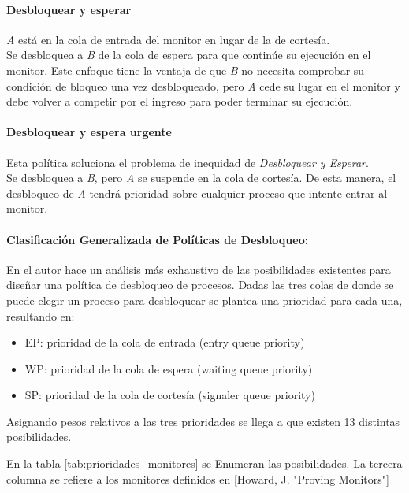 \paragraph{Desbloquear y esperar}
\textit{A} está en la cola de entrada del monitor en lugar de la de cortesía.\\
Se desbloquea a \textit{B} de la cola de espera para que continúe su ejecución
en el monitor. Este enfoque tiene la ventaja de que \textit{B} no necesita
comprobar su condición de bloqueo una vez desbloqueado, pero \textit{A} cede su
lugar en el monitor y debe volver a competir por el ingreso para poder terminar
su ejecución.


\paragraph{Desbloquear y espera urgente}
Esta política soluciona el problema de inequidad de \textit{Desbloquear y
Esperar}.\\
Se desbloquea a \textit{B}, pero \textit{A} se suspende en la cola de cortesía.
De esta manera, el desbloqueo de \textit{A} tendrá prioridad sobre cualquier
proceso que intente entrar al monitor.

\paragraph{Clasificación Generalizada de Políticas de Desbloqueo:}
En \cite{MonitorClassification} el autor hace un análisis más exhaustivo de las
posibilidades existentes para diseñar una política de desbloqueo de procesos.
Dadas las tres colas de donde se puede elegir un proceso para desbloquear se
plantea una prioridad para cada una, resultando en:
\begin{itemize}
    \item EP: prioridad de la cola de entrada (entry queue priority)
    \item WP: prioridad de la cola de espera (waiting queue priority)
    \item SP: prioridad de la cola de cortesía (signaler queue priority)
\end{itemize}
Asignando pesos relativos a las tres prioridades se llega a que existen 13
distintas posibilidades.

En la tabla \ref{tab:prioridades_monitores} se Enumeran las posibilidades. La
tercera columna se refiere a los monitores definidos en [Howard, J. "Proving
Monitors"]

